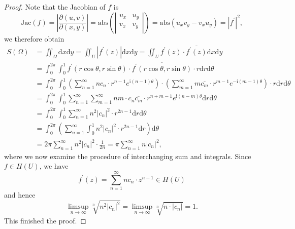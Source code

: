 \begin{proof}
Note that the Jacobian of $f$ is 
$$
\mathrm{Jac}\left( f \right) =\left| \frac{\partial \left( u,v \right)}{\partial \left( x,y \right)} \right|=\mathrm{abs} \left( \left| \begin{matrix}
	u_x&		u_y\\
	v_x&		v_y\\
\end{matrix} \right| \right) =\mathrm{abs} \left( u_xv_y-v_xu_y \right) =\left| f^{\prime} \right|^2,
$$
we therefore obtain 
$$
\begin{aligned}
S\left( \Omega \right) &=\iint_{\Omega}{\mathrm{d}x\mathrm{d}y}=\iint_U{\left| f^{\prime}\left( z \right) \right|\mathrm{d}x\mathrm{d}y}=\iint_U{f^{\prime}\left( z \right) \cdot \overline{f^{\prime}\left( z \right) }\mathrm{d}x\mathrm{d}y}
\\
&=\int_0^{2\pi}{\int_0^1{f^{\prime}\left( r\cos \theta ,r\sin \theta \right) \cdot \overline{f^{\prime}\left( r\cos \theta ,r\sin \theta \right) }\cdot r\mathrm{d}r\mathrm{d}\theta}}
\\
&=\int_0^{2\pi}{\int_0^1{\left( \sum_{n=1}^{\infty}{nc_n\cdot r^{n-1}e^{\mathrm{i}\left( n-1 \right) \theta}} \right) \cdot \left( \sum_{m=1}^{\infty}{m\overline{c_m}\cdot r^{m-1}e^{-\mathrm{i}\left( m-1 \right) \theta}} \right) \cdot r\mathrm{d}r\mathrm{d}\theta}}
\\
&=\int_0^{2\pi}{\int_0^1{\sum_{n=1}^{\infty}{\sum_{m=1}^{\infty}{nm\cdot c_n\overline{c_m}\cdot r^{n+m-1}e^{\mathrm{i}\left( n-m \right) \theta}}}\mathrm{d}r}\mathrm{d}\theta}
\\
&=\int_0^{2\pi}{\int_0^1{\sum_{n=1}^{\infty}{n^2\left| c_n \right|^2\cdot r^{2n-1}\mathrm{d}r\mathrm{d}\theta}}}
\\
&=\int_0^{2\pi}{\left( \sum_{n=1}^{\infty}{\int_0^1{n^2\left| c_n \right|^2\cdot r^{2n-1}\mathrm{d}r}} \right) \mathrm{d}\theta}
\\
&=2\pi \sum_{n=1}^{\infty}{n^2\left| c_n \right|^2\cdot \frac{1}{2n}}=\pi \sum_{n=1}^{\infty}{n\left| c_n \right|^2},
\end{aligned}
$$
where we now examine the procedure of interchanging sum and integrals. Since $f\in H(U)$, we have 
$$
f^{\prime}\left( z \right) =\sum_{n=1}^{\infty}{nc_n\cdot z^{n-1}}\in H\left( U \right) 
$$
and hence 
$$
\mathop {\lim\mathrm{sup}} \limits_{n\rightarrow \infty}\sqrt[n]{n^2\left| c_n \right|^2}=\mathop {\lim\mathrm{sup}} \limits_{n\rightarrow \infty}\sqrt[n]{n\cdot \left| c_n \right|}=1.
$$
This finished the proof.
\end{proof}
